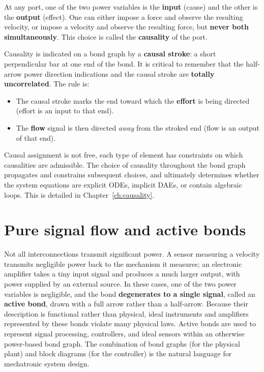 At any port, one of the two power variables is the \textbf{input} (cause) and the other is the \textbf{output} (effect).
One can either impose a force and observe the resulting velocity, or impose a velocity and observe the resulting force, but \textbf{never both simultaneously}.
This choice is called the \textbf{causality} of the port.

Causality is indicated on a bond graph by a \textbf{causal stroke}: a short perpendicular bar at one end of the bond.
It is critical to remember that the half-arrow power direction indications and the causal stroke are \textbf{totally uncorrelated}.
The rule is:
\begin{itemize}[leftmargin=2em,itemsep=2pt]
  \item The causal stroke marks the end toward which the \textbf{effort} is being directed (effort is an input to that end).
  \item The \textbf{flow} signal is then directed \emph{away} from the stroked end (flow is an output of that end).
\end{itemize}

\begin{center}
\end{center}

Causal assignment is not free, each type of element has constraints on which causalities are admissible.
The choice of causality throughout the bond graph propagates and constrains subsequent choices, and ultimately determines whether the system equations are explicit ODEs, implicit DAEs, or contain algebraic loops.
This is detailed in Chapter~\ref{ch:causality}.

\section{Pure signal flow and active bonds}

Not all interconnections transmit significant power.
A sensor measuring a velocity transmits negligible power back to the mechanism it measures;
an electronic amplifier takes a tiny input signal and produces a much larger output, with power supplied by an external source.
In these cases, one of the two power variables is negligible, and the bond \textbf{degenerates to a single signal}, called an \textbf{active bond}, drawn with a full arrow rather than a half-arrow.
Because their description is functional rather than physical, ideal instruments and amplifiers represented by these bonds violate many physical laws. 
Active bonds are used to represent signal processing, controllers, and ideal sensors within an otherwise power-based bond graph.
The combination of bond graphs (for the physical plant) and block diagrams (for the controller) is the natural language for mechatronic system design.